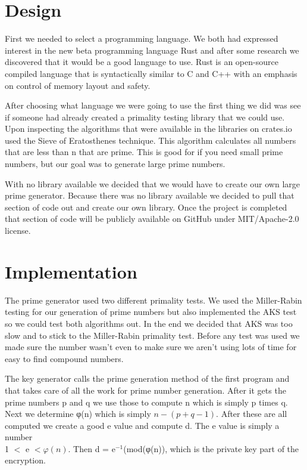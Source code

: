 \documentclass[12pt,technote]{IEEEtran}
\begin{document}
\section{Design}
First we needed to select a programming language. We both had expressed 
interest in the new beta programming language Rust and after some research we 
discovered that it would be a good language to use. Rust is an open-source 
compiled language that is syntactically similar to C and C++ with an emphasis on 
control of memory layout and safety.  

\par After choosing what language we were going to use the first thing we did 
was see if someone had already created a primality testing library that we could 
use. Upon inspecting the algorithms that were available in the libraries on 
crates.io used the Sieve of Eratosthenes technique. This algorithm calculates 
all numbers that are less than n that are prime. This is good for if you need 
small prime numbers, but our goal was to generate large prime numbers. 

\par With no library available we decided that we would have to create our own 
large prime generator. Because there was no library available we decided to pull 
that section of code out and create our own library. Once the project is 
completed that section of code will be publicly available on GitHub under 
MIT/Apache-2.0 license.


\section{Implementation}
The prime generator used two different primality tests. We used the Miller-Rabin 
testing for our generation of prime numbers but also implemented the AKS test 
so we could test both algorithms out.
In the end we decided that AKS was too slow and to stick to the Miller-Rabin 
primality test.
Before any test was used we made sure the number wasn't even to make sure we 
aren't using lots of time for easy to find compound numbers.
\par The key generator calls the prime generation method of the first program 
and that takes care of all the work for prime number generation. After it gets 
the prime numbers p and q we use those to compute n which is simply p times q. 
Next we determine φ(n) which is simply $n - (p + q -1)$. After these are all 
computed we create a good e value and compute d. The e value is simply a number 
\\1 $<$ e $<φ(n)$. Then d = e$^{-1}$(mod(φ(n)), which is the private key part of 
the encryption.
\end{document}
